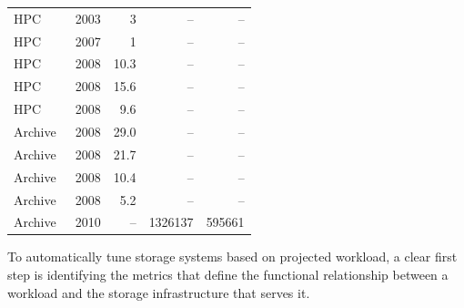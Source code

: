 \begin{table}[h]
\begin{tabular}{lcrrr}
HPC~\cite{LLNL03} & 2003 & 3 & -- & -- \\%
HPC~\cite{ian-tos} & 2007 & 1 & -- & -- \\%
HPC~\cite{dayal} & 2008 & 10.3 & -- & --\\%
HPC~\cite{dayal} & 2008 & 15.6 & -- & -- \\%
HPC~\cite{dayal} & 2008 & 9.6 & -- & -- \\%
Archive~\cite{dayal} & 2008 & 29.0 & -- & -- \\%
Archive~\cite{dayal} & 2008 & 21.7 & -- & -- \\%
Archive~\cite{dayal} & 2008 & 10.4 & -- & -- \\%
Archive~\cite{dayal} & 2008 & 5.2 & -- & -- \\%
Archive & 2010 & -- & 1326137 & 595661 \\%
\bottomrule
\end{tabular}
\normalsize
\end{table}
To automatically tune storage systems based on projected workload, a clear first
step is identifying the metrics that define the functional relationship between
a workload and the storage infrastructure that serves it.  
%
%

